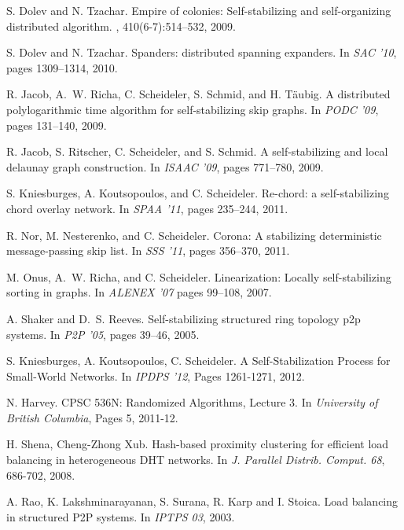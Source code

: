 \documentclass[11pt]{article}
\begin{document}
\begin{thebibliography}{10}
S. Dolev and N. Tzachar.
\newblock Empire of colonies: Self-stabilizing and self-organizing distributed
  algorithm.
, 410(6-7):514--532, 2009.

S. Dolev and N. Tzachar.
\newblock Spanders: distributed spanning expanders.
\newblock In {\em SAC '10}, pages 1309--1314, 2010.

R. Jacob, A.~W. Richa, C. Scheideler, S. Schmid, and H. T{\"a}ubig.
\newblock A distributed polylogarithmic time algorithm for self-stabilizing
  skip graphs.
\newblock In {\em PODC '09}, pages 131--140, 2009.

R. Jacob, S. Ritscher, C. Scheideler, and S. Schmid.
\newblock A self-stabilizing and local delaunay graph construction.
\newblock In {\em ISAAC '09}, pages 771--780, 2009.

S. Kniesburges, A. Koutsopoulos, and C. Scheideler.
\newblock Re-chord: a self-stabilizing chord overlay network.
\newblock In {\em SPAA '11}, pages 235--244, 2011.


R. Nor, M. Nesterenko, and C. Scheideler.
\newblock Corona: A stabilizing deterministic message-passing skip list.
\newblock In {\em SSS '11}, pages 356--370, 2011.

M. Onus, A.~W. Richa, and C. Scheideler.
\newblock Linearization: Locally self-stabilizing sorting in graphs.
\newblock In {\em ALENEX '07} pages 99--108, 2007.




A. Shaker and D.~S. Reeves.
\newblock Self-stabilizing structured ring topology p2p systems.
\newblock In {\em P2P '05}, pages 39--46, 2005.

S. Kniesburges, A. Koutsopoulos, C. Scheideler.
\newblock A Self-Stabilization Process for Small-World Networks.
\newblock In {\em IPDPS '12}, Pages 1261-1271, 2012.

N. Harvey.
\newblock CPSC 536N: Randomized Algorithms, Lecture 3.
\newblock In {\em University of British Columbia}, Pages 5, 2011-12.



H. Shena, Cheng-Zhong Xub.
\newblock Hash-based proximity clustering for efficient load balancing in heterogeneous DHT networks.
\newblock In {\em J. Parallel Distrib. Comput. 68},  686-702, 2008.

A. Rao, K. Lakshminarayanan, S. Surana, R. Karp and I. Stoica.
\newblock Load balancing in structured P2P systems.
\newblock In {\em IPTPS 03},  2003.






\end{thebibliography}
\end{document}
